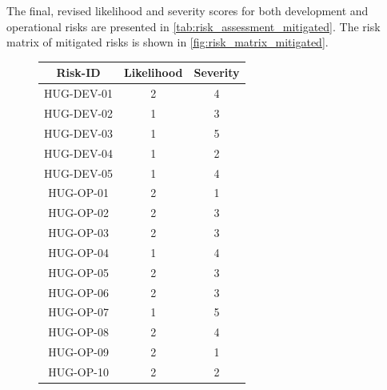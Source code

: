 The final, revised likelihood and severity scores for both development and operational risks are presented in \autoref{tab:risk_assessment_mitigated}. The risk matrix of mitigated risks is shown in \autoref{fig:risk_matrix_mitigated}.


\begin{figure}[H]
\centering

\begin{minipage}[t]{0.42\textwidth}
    \vspace{0pt}
    \centering
    \label{tab:risk_assessment_mitigated}
    \small
    \begin{tabular}{|c|c|c|}
        \hline
        \textbf{Risk-ID} & \textbf{Likelihood} & \textbf{Severity} \\ \hline
        HUG-DEV-01 & 2 & 4\\ \hline
        HUG-DEV-02 & 1 & 3\\ \hline
        HUG-DEV-03 & 1 & 5\\ \hline
        HUG-DEV-04 & 1 & 2\\ \hline
        HUG-DEV-05 & 1 & 4\\ \hline
        HUG-OP-01 & 2 & 1 \\ \hline
        HUG-OP-02 & 2 & 3 \\ \hline
        HUG-OP-03 & 2 & 3 \\ \hline
        HUG-OP-04 & 1 & 4 \\ \hline
        HUG-OP-05 & 2 & 3 \\ \hline
        HUG-OP-06 & 2 & 3 \\ \hline
        HUG-OP-07 & 1 & 5 \\ \hline
        HUG-OP-08 & 2 & 4 \\ \hline
        HUG-OP-09 & 2 & 1 \\ \hline
        HUG-OP-10 & 2 & 2 \\ \hline
    \end{tabular}
\end{minipage}
\hfill
\begin{minipage}[t]{0.55\textwidth}
    \vspace{25pt}
    \centering
\end{minipage}
\end{figure}
